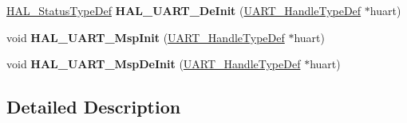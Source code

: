\begin{DoxyCompactItemize}
\item 
\mbox{\label{group___u_a_r_t___exported___functions___group1_ga8d98eaab25e61ae12e2e240c3388c57b}} 
\hyperlink{stm32f1xx__hal__def_8h_a63c0679d1cb8b8c684fbb0632743478f}{H\+A\+L\+\_\+\+Status\+Type\+Def} {\bfseries H\+A\+L\+\_\+\+U\+A\+R\+T\+\_\+\+De\+Init} (\hyperlink{struct_u_a_r_t___handle_type_def}{U\+A\+R\+T\+\_\+\+Handle\+Type\+Def} $\ast$huart)
\item 
\mbox{\label{group___u_a_r_t___exported___functions___group1_ga0e553b32211877322f949b14801bbfa7}} 
void {\bfseries H\+A\+L\+\_\+\+U\+A\+R\+T\+\_\+\+Msp\+Init} (\hyperlink{struct_u_a_r_t___handle_type_def}{U\+A\+R\+T\+\_\+\+Handle\+Type\+Def} $\ast$huart)
\item 
\mbox{\label{group___u_a_r_t___exported___functions___group1_ga718f39804e3b910d738a0e1e46151188}} 
void {\bfseries H\+A\+L\+\_\+\+U\+A\+R\+T\+\_\+\+Msp\+De\+Init} (\hyperlink{struct_u_a_r_t___handle_type_def}{U\+A\+R\+T\+\_\+\+Handle\+Type\+Def} $\ast$huart)
\end{DoxyCompactItemize}


\subsection{Detailed Description}
